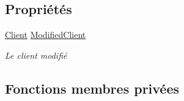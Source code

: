 \subsection*{Propriétés}
\begin{DoxyCompactItemize}
\item 
\mbox{\hyperlink{class_m_t_connect_agent_1_1_model_1_1_client}{Client}} \mbox{\hyperlink{class_m_t_connect_agent_1_1_form_modifie_client_a8f2c248d245052d915c92a991ce11e75}{Modified\+Client}}
\begin{DoxyCompactList}\small\item\em Le client modifié \end{DoxyCompactList}\end{DoxyCompactItemize}
\subsection*{Fonctions membres privées}
